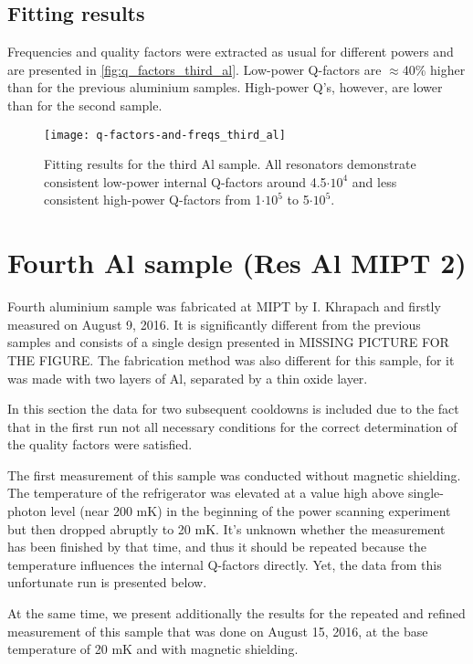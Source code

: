 \documentclass[12pt]{article}
\numberwithin{equation}{section}
\numberwithin{figure}{section}
\begin{document}
\subsection{Fitting results}

Frequencies and quality factors were extracted as usual for different powers and are presented in \autoref{fig:q_factors_third_al}. Low-power Q-factors are $\approx$40\% higher than for the previous aluminium samples. High-power Q's, however, are lower than for the second sample. 

\begin{figure}[h]
\centering
\texttt{[image: q-factors-and-freqs\_third\_al]}
\caption{Fitting results for the third Al sample. All resonators demonstrate consistent low-power internal Q-factors around 4.5$\cdot 10^4$ and less consistent high-power Q-factors from 1$\cdot 10^5$ to 5$\cdot 10^5$.}
\label{fig:q_factors_third_al}
\end{figure}

\section{Fourth Al sample (Res Al MIPT 2)}

Fourth aluminium sample was fabricated at MIPT by I. Khrapach and firstly measured on August 9, 2016. It is significantly different from the previous samples and consists of a single design presented in MISSING PICTURE FOR THE FIGURE. The fabrication method was also different for this sample, for it was made with two layers of Al, separated by a thin oxide layer.

In this section the data for two subsequent cooldowns is included due to the fact that in the first run not all necessary conditions for the correct determination of the quality factors were satisfied.

The first measurement of this sample was conducted without magnetic shielding. The temperature of the refrigerator was elevated at a value high above single-photon level (near 200 mK) in the beginning of the power scanning experiment but then dropped abruptly to 20 mK. It's unknown whether the measurement has been finished by that time, and thus it should be repeated because the temperature influences the internal Q-factors directly. Yet, the data from this unfortunate run is presented below.

At the same time, we present additionally the results for the repeated and refined measurement of this sample that was done on August 15, 2016, at the base temperature of 20 mK and with magnetic shielding. 
\end{document}
